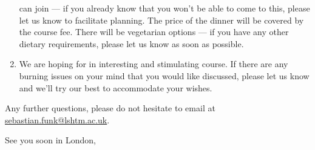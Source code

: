 \documentclass[paper=a4, 11pt]{scrlttr2}
\begin{document}
\begin{letter}{}
\begin{enumerate}
can join --- if you already know that you won't be able to come to this,
please let us know to facilitate planning. The price of the dinner will
be covered by the course fee. There will be vegetarian options --- if you
have any other dietary requirements, please let us know as soon as
possible.
\item We are hoping for in interesting and stimulating course. If there are
any burning issues on your mind that you would like discussed, please
let us know and we'll try our best to accommodate your wishes.
\end{enumerate}
Any further questions, please do not hesitate to email at \href{mailto:sebastian.funk@lshtm.ac.uk}{sebastian.funk@lshtm.ac.uk}.

\closing{See you soon in London,}
\end{letter}
\end{document}
